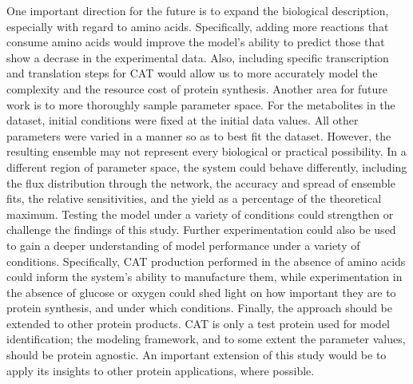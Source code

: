\documentclass[12pt]{article}
\begin{document}

One important direction for the future is to expand the biological description, especially with regard to amino acids.
Specifically, adding more reactions that consume amino acids would improve the model's ability to predict those that show a decrase in the experimental data.
Also, including specific transcription and translation steps for CAT would allow us to more accurately model the complexity and the resource cost of protein synthesis.
Another area for future work is to more thoroughly sample parameter space.
For the metabolites in the dataset, initial conditions were fixed at the initial data values.
All other parameters were varied in a manner so as to best fit the dataset.
However, the resulting ensemble may not represent every biological or practical possibility.
In a different region of parameter space, the system could behave differently, including the flux distribution through the network, the accuracy and spread of ensemble fits, the relative sensitivities, and the yield as a percentage of the theoretical maximum.
Testing the model under a variety of conditions could strengthen or challenge the findings of this study.
Further experimentation could also be used to gain a deeper understanding of model performance under a variety of conditions.
Specifically, CAT production performed in the absence of amino acids could inform the system's ability to manufacture them, while experimentation in the absence of glucose or oxygen could shed light on how important they are to protein synthesis, and under which conditions.
Finally, the approach should be extended to other protein products.
CAT is only a test protein used for model identification; the modeling framework, and to some extent the parameter values, should be protein agnostic.
An important extension of this study would be to apply its insights to other protein applications, where possible.
\end{document}
